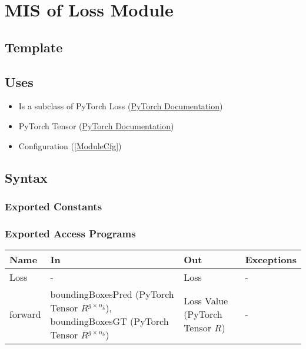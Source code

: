 \documentclass[12pt, titlepage]{article}
\begin{document}
\newpage

\section{MIS of Loss Module} \label{ModuleLoss} 

\subsection{Template}



\subsection{Uses}

\begin{itemize}
  \item Is a subclass of PyTorch Loss (\href{https://pytorch.org/docs/stable/nn.html#loss-functions}{PyTorch Documentation})
  \item PyTorch Tensor (\href{https://pytorch.org/docs/stable/tensors.html}{PyTorch Documentation})
  \item Configuration (\ref{ModuleCfg})
\end{itemize}

\subsection{Syntax}



\subsubsection{Exported Constants}



\subsubsection{Exported Access Programs}

\begin{center}
\begin{tabular}{p{2cm}|p{6cm}|p{4cm}|p{2cm}}
\hline
\textbf{Name} & \textbf{In} & \textbf{Out} & \textbf{Exceptions} \\
\hline
Loss & - & Loss & - \\
\hline
forward & boundingBoxesPred (PyTorch Tensor $R^{g\times{}n_{\hat{b}}}$), boundingBoxesGT (PyTorch Tensor $R^{g\times{}n_{b}}$) & Loss Value (PyTorch Tensor $R$) & - \\
\hline
\end{tabular}
\end{center}
\end{document}
